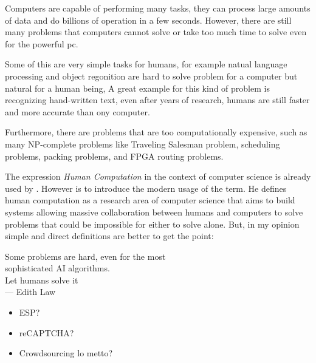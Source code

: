 Computers are capable of performing many tasks, they can process large
amounts of data and do billions of operation in a few seconds.
However, there are still many problems that computers cannot solve
or take too much time to solve even for the powerful pc.

Some of this are very simple tasks for humans, for example natual language
processing and object regonition are hard to solve problem for a computer
but natural for a human being, A great example for this kind of problem
is recognizing hand-written text, even after years of research,
humans are still faster and more accurate than ony computer.

Furthermore, there are problems that are too computationally expensive,
such as many NP-complete problems like Traveling Salesman problem,
scheduling problems, packing problems, and FPGA routing problems.

The expression \emph{Human Computation} in the context of computer
science is already used by \cite{cogprints499}. However is \cite{human:comp}
to introduce the modern usage of the term. He defines human computation
as a research area of computer science that aims to build systems allowing
massive collaboration between humans and computers to solve problems that
could be impossible for either to solve alone. But, in my opinion simple
and direct definitions are better to get the point:
\begin{quoting}
	Some problems are hard, even for the most\\
	sophisticated AI algorithms.\\
	Let humans solve it\omissis\\
	\medskip
    {\rm --- Edith Law}
\end{quoting}


\begin{itemize}
	\item ESP?
	\item reCAPTCHA?
	\item Crowdsourcing lo metto?
\end{itemize}

